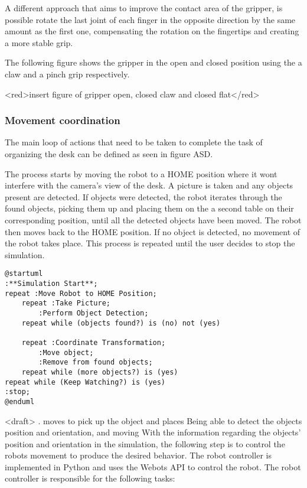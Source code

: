 A different approach that aims to improve the contact area of the gripper, is possible rotate the last joint of each finger in the opposite direction by the same amount as the first one, compensating the rotation on the fingertips and creating a more stable grip.

The following figure shows the gripper in the open and closed position using the a claw and a pinch grip respectively.

<red>insert figure of gripper open, closed claw and closed flat</red>


\subsubsection{Movement coordination}

The main loop of actions that need to be taken to complete the task of organizing the desk can be defined as seen in figure ASD. 

The process starts by moving the robot to a HOME position where it wont interfere with the camera's view of the desk. A picture is taken and any objects present are detected. If objects were detected, the robot iterates through the found objects, picking them up and placing them on the a second table on their corresponding position, until all the detected objects have been moved. The robot then moves back to the HOME position. If no object is detected, no movement of the robot takes place. This process is repeated until the user decides to stop the simulation.

\begin{lstlisting}[]%language=plantuml
@startuml
:**Simulation Start**;
repeat :Move Robot to HOME Position;
    repeat :Take Picture;
        :Perform Object Detection;
    repeat while (objects found?) is (no) not (yes)

    repeat :Coordinate Transformation;
        :Move object;
        :Remove from found objects;
    repeat while (more objects?) is (yes)
repeat while (Keep Watching?) is (yes)
:stop;
@enduml
\end{lstlisting}

<draft>
. moves to pick up the object and places  
Being able to detect the objects position and orientation, and moving 
With the information regarding the objects' position and orientation in the simulation, the following step is to control the robots movement to produce the desired behavior. The robot controller is implemented in Python and uses the Webots API to control the robot. The robot controller is responsible for the following tasks:

